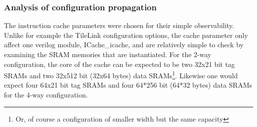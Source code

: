 \documentclass[journal,a4paper]{IEEEtran}
\makeatletter
\newcommand\footnoteref[1]{\protected@xdef\@thefnmark{\ref{#1}}\@footnotemark}
\makeatother
\begin{document}
\subsubsection{Analysis of configuration propagation}
The instruction cache parameters were chosen for their simple observability. Unlike for example the TileLink configuration options, the cache parameter only affect one verilog module, ICache\_icache, and are relatively simple to check by examining the SRAM memories that are instantiated.
For the 2-way configuration, the core of the cache can be expected to be two 32x21 bit tag SRAMs and two 32x512 bit (32x64 bytes) data SRAMs\footnote{\label{note-width}Or, of course a configuration of smaller width but the same capacity}.
Likewise one would expect four 64x21 bit tag SRAMs and four 64*256 bit (64*32 bytes) data SRAMs\footnoteref{note-width} for the 4-way configuration.

\end{document}
